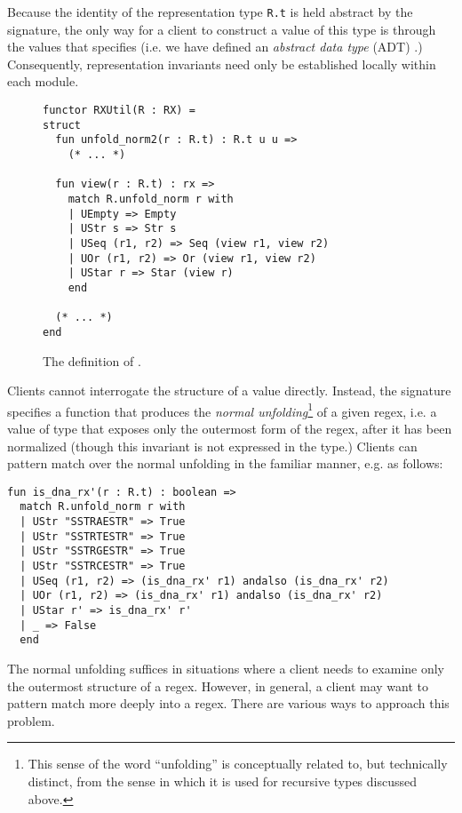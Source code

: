 Because the identity of the representation type \lstinline{R.t} is held abstract by the signature, the only way for a client to construct a value of this type is through the values that  specifies (i.e. we have defined an \emph{abstract data type} (ADT) \cite{liskov1974programming}.) Consequently, representation invariants need only be established locally within each module.



\begin{figure}
\begin{lstlisting}[numbers=none]
functor RXUtil(R : RX) = 
struct
  fun unfold_norm2(r : R.t) : R.t u u => 
    (* ... *)

  fun view(r : R.t) : rx => 
    match R.unfold_norm r with 
    | UEmpty => Empty
    | UStr s => Str s
    | USeq (r1, r2) => Seq (view r1, view r2)
    | UOr (r1, r2) => Or (view r1, view r2)
    | UStar r => Star (view r)
    end 

  (* ... *)
end
\end{lstlisting}
\caption{The definition of .}
\label{fig:RXUtil}
\end{figure}

Clients cannot interrogate the structure of a value  directly. Instead, the signature specifies a function  that produces the \emph{normal unfolding}\footnote{This sense of the word ``unfolding'' is conceptually related to, but technically distinct, from the sense in which it is used for recursive types discussed above.} of a given regex, i.e. a value of type  that exposes only the outermost form of the regex, after it has been normalized (though this invariant is not expressed in the type.) Clients can pattern match over the {normal unfolding} in the familiar manner, e.g. as follows:
\begin{lstlisting}[numbers=none]
fun is_dna_rx'(r : R.t) : boolean => 
  match R.unfold_norm r with 
  | UStr "SSTRAESTR" => True
  | UStr "SSTRTESTR" => True
  | UStr "SSTRGESTR" => True
  | UStr "SSTRCESTR" => True
  | USeq (r1, r2) => (is_dna_rx' r1) andalso (is_dna_rx' r2)
  | UOr (r1, r2) => (is_dna_rx' r1) andalso (is_dna_rx' r2)
  | UStar r' => is_dna_rx' r'
  | _ => False
  end
\end{lstlisting}

The normal unfolding suffices in situations where a client needs to examine only the outermost structure of a regex. However, in general, a client may want to pattern match more deeply into a regex. There are various ways to approach this problem. 

